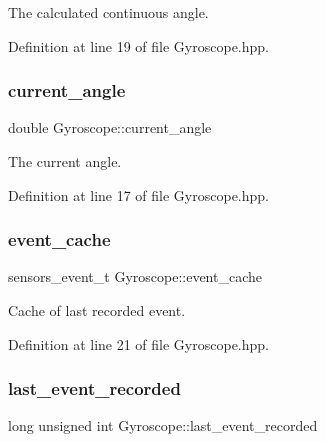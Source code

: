 The calculated continuous angle. 



Definition at line 19 of file Gyroscope.\+hpp.

\mbox{\label{class_gyroscope_a6da1957aa183ed0f0aabc6cd1ad85bf1}} 
\subsubsection{\texorpdfstring{current\+\_\+angle}{current\_angle}}
{\footnotesize\ttfamily double Gyroscope\+::current\+\_\+angle\hspace{0.3cm}{\ttfamily [private]}}



The current angle. 



Definition at line 17 of file Gyroscope.\+hpp.

\mbox{\label{class_gyroscope_a6c8b9e319b379c2f1582afbe25e68c76}} 
\subsubsection{\texorpdfstring{event\+\_\+cache}{event\_cache}}
{\footnotesize\ttfamily sensors\+\_\+event\+\_\+t Gyroscope\+::event\+\_\+cache\hspace{0.3cm}{\ttfamily [private]}}



Cache of last recorded event. 



Definition at line 21 of file Gyroscope.\+hpp.

\mbox{\label{class_gyroscope_a8a6c3d747717b3bede6400c17a4696b6}} 
\subsubsection{\texorpdfstring{last\+\_\+event\+\_\+recorded}{last\_event\_recorded}}
{\footnotesize\ttfamily long unsigned int Gyroscope\+::last\+\_\+event\+\_\+recorded\hspace{0.3cm}{\ttfamily [private]}}




